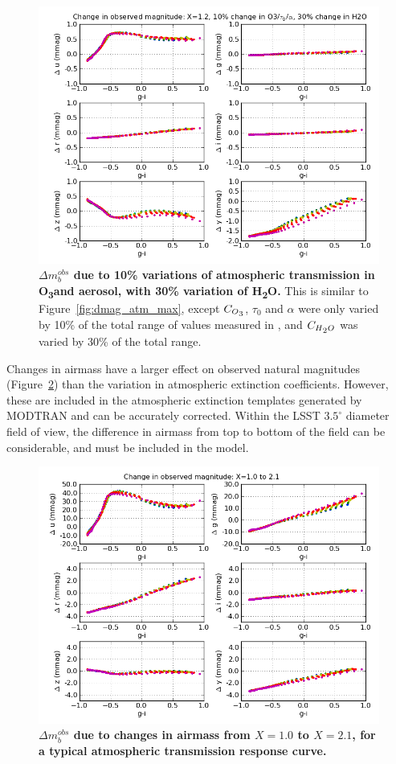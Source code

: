 \documentclass[12pt,preprint]{aastex}
\newcommand{\water}   {H\textsubscript{2}O}
\newcommand{\ozone}    {O\textsubscript{3}}
\begin{document}
\begin{figure}
\centering
\includegraphics[width=6in]{delta_mags_10}
\caption{{\small
{\bf $\Delta m_b^{obs}$ due to 10\% variations of 
atmospheric transmission in \ozone and aerosol, with 30\% variation of \water.} 
This is similar to Figure~\ref{fig:dmag_atm_max}, except $C_{\ozone}$,
$\tau_0$ and $\alpha$ were only varied by 10\% of the total range of
values measured in \citet{Burke2010b}, and $C_{\water}$ was varied by 30\%
of the total range. }}
\label{fig:dmag_atm_10}
\end{figure}

Changes in airmass have a larger effect on observed natural magnitudes
(Figure~\ref{fig:dmag_airmass}) than the variation in atmospheric
extinction coefficients. However, these are included in the atmospheric extinction
templates generated by MODTRAN and can be accurately corrected.
Within the LSST $3.5^\circ$ diameter field of view, the difference in
airmass from top to bottom of the field can be considerable, and must
be included in the model. 

\begin{figure}
\centering
\includegraphics[width=6in]{delta_mags_airmass_big}
\caption{{\small
{\bf $\Delta m_b^{obs}$ due to changes in airmass from $X=1.0$ 
to $X=2.1$, for a typical atmospheric transmission response curve.}
}}
\label{fig:dmag_airmass}
\end{figure}
\end{document}
